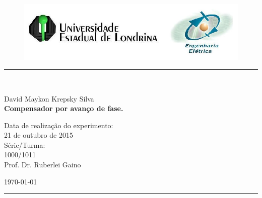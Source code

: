 \begin{titlepage}
\begin{center}
\begin{figure}[h]
\includegraphics[scale=0.76]{img/topdotitulo.png}
\end{figure}
\rule{\columnwidth}{1.5mm}
\

\large David Maykon Krepsky Silva\\

\vspace{4cm}
{\bf \Large Compensador por avanço de fase.}
\vspace{3.5cm}

\begin{flushright}
Data de realização do experimento:\\
21 de outubro de 2015\\
Série/Turma:\\
1000/1011\\
Prof. Dr. Ruberlei Gaino
\end{flushright}

\vspace{3.2cm}
\today

\rule{\columnwidth}{1.3mm}
\end{center}
\end{titlepage}